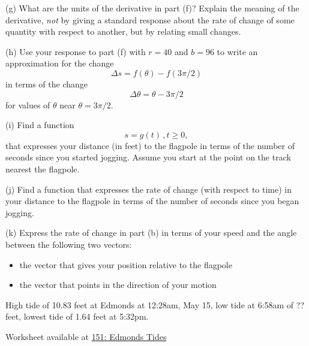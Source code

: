 \documentclass{ximera}
\begin{document}
\begin{exercise}
(g) What are the units of the derivative in part (f)? Explain the meaning of the derivative, \emph{not} by giving a standard response about the rate of change of some quantity with respect to another, but by relating small changes.

(h) Use your response to part (f) with $r=40$ and $b=96$ to write an approximation for the change
\[
         \Delta s = f(\theta) - f(3\pi/2)
\]
in terms of the change 
\[
     \Delta \theta = \theta - 3\pi/2
\]
for values of $\theta$ near $\theta=3\pi/2$. 


(i) Find a function 
\[
   s = g(t) \, , t\geq 0,
\]
that expresses your distance (in feet) to the flagpole in terms of the number of seconds since you started jogging. Assume you start at the point on the track nearest the flagpole.

(j) Find a function that expresses the rate of change (with respect to time) in your distance to the flagpole in terms of the number of seconds since you began jogging.

(k) Express the rate of change in part (b) in terms of your speed and the angle between the following two vectors:

\begin{itemize}
\item{the vector that gives your position relative to the flagpole}

\item{the vector that points in the direction of your motion}
\end{itemize}
\end{exercise}


\begin{exercise} \label{Ex:45533tt4t4}
High tide of 10.83 feet at Edmonds at 12:28am, May 15, low tide at 6:58am of ?? feet, lowest tide of 1.64 feet at 5:32pm.

\begin{onlineOnly}
    \begin{center}
\end{center}
\end{onlineOnly}

Worksheet available at \href{https://www.desmos.com/calculator/zta9tkzzmx}{151: Edmonds Tides}
\end{exercise}
\end{document}
